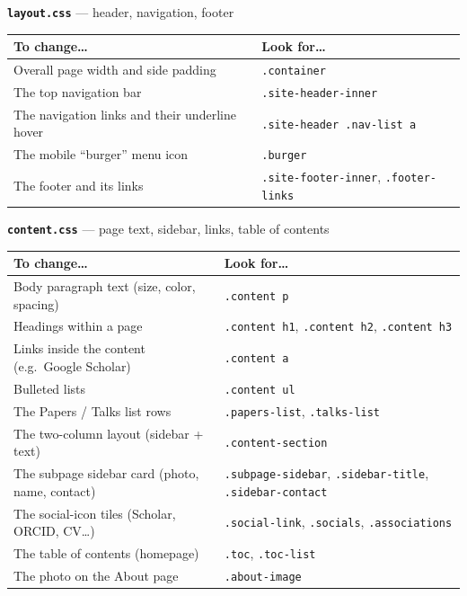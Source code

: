 \documentclass[11pt,a4paper]{article}
\newcommand{\file}[1]{\texttt{#1}}
\begin{document}
\vspace{4pt}
\noindent\textbf{\file{layout.css}} --- header, navigation, footer
\begin{center}
\begin{tabular}{@{}p{8.0cm}p{7.0cm}@{}}
\textbf{To change\dots} & \textbf{Look for\dots} \\[2pt]
\hline
\rule{0pt}{2.4ex}%
Overall page width and side padding & \texttt{.container} \\[3pt]
The top navigation bar & \texttt{.site-header-inner} \\[3pt]
The navigation links and their underline hover & \texttt{.site-header .nav-list a} \\[3pt]
The mobile ``burger'' menu icon & \texttt{.burger} \\[3pt]
The footer and its links & \texttt{.site-footer-inner}, \texttt{.footer-links} \\
\end{tabular}
\end{center}

\vspace{4pt}
\noindent\textbf{\file{content.css}} --- page text, sidebar, links, table of contents
\begin{center}
\begin{tabular}{@{}p{8.0cm}p{7.0cm}@{}}
\textbf{To change\dots} & \textbf{Look for\dots} \\[2pt]
\hline
\rule{0pt}{2.4ex}%
Body paragraph text (size, color, spacing) & \texttt{.content p} \\[3pt]
Headings within a page & \texttt{.content h1}, \texttt{.content h2}, \texttt{.content h3} \\[3pt]
Links inside the content (e.g.\ Google Scholar) & \texttt{.content a} \\[3pt]
Bulleted lists & \texttt{.content ul} \\[3pt]
The Papers / Talks list rows & \texttt{.papers-list}, \texttt{.talks-list} \\[3pt]
The two-column layout (sidebar + text) & \texttt{.content-section} \\[3pt]
The subpage sidebar card (photo, name, contact) & \texttt{.subpage-sidebar}, \texttt{.sidebar-title}, \texttt{.sidebar-contact} \\[3pt]
The social-icon tiles (Scholar, ORCID, CV\dots) & \texttt{.social-link}, \texttt{.socials}, \texttt{.associations} \\[3pt]
The table of contents (homepage) & \texttt{.toc}, \texttt{.toc-list} \\[3pt]
The photo on the About page & \texttt{.about-image} \\
\end{tabular}
\end{center}
\end{document}
